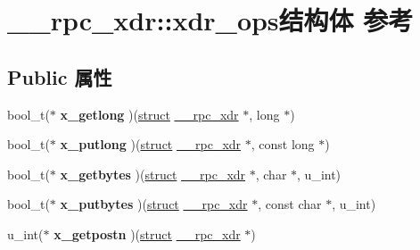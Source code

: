 \hypertarget{struct____rpc__xdr_1_1xdr__ops}{}\section{\+\_\+\+\_\+rpc\+\_\+xdr\+:\+:xdr\+\_\+ops结构体 参考}
\label{struct____rpc__xdr_1_1xdr__ops}
\subsection*{Public 属性}
\begin{DoxyCompactItemize}
\item 
\mbox{\label{struct____rpc__xdr_1_1xdr__ops_a3df5aa6cac0bef635073d771d989e66f}} 
bool\+\_\+t($\ast$ {\bfseries x\+\_\+getlong} )(\hyperlink{interfacestruct}{struct} \hyperlink{struct____rpc__xdr}{\+\_\+\+\_\+rpc\+\_\+xdr} $\ast$, long $\ast$)
\item 
\mbox{\label{struct____rpc__xdr_1_1xdr__ops_a6f97ff5af75068b54d5eeb89f714be36}} 
bool\+\_\+t($\ast$ {\bfseries x\+\_\+putlong} )(\hyperlink{interfacestruct}{struct} \hyperlink{struct____rpc__xdr}{\+\_\+\+\_\+rpc\+\_\+xdr} $\ast$, const long $\ast$)
\item 
\mbox{\label{struct____rpc__xdr_1_1xdr__ops_ad652c0de62c38edce1d61baa4b67b617}} 
bool\+\_\+t($\ast$ {\bfseries x\+\_\+getbytes} )(\hyperlink{interfacestruct}{struct} \hyperlink{struct____rpc__xdr}{\+\_\+\+\_\+rpc\+\_\+xdr} $\ast$, char $\ast$, u\+\_\+int)
\item 
\mbox{\label{struct____rpc__xdr_1_1xdr__ops_a7a1a5ac7a82942203215f656d15b313b}} 
bool\+\_\+t($\ast$ {\bfseries x\+\_\+putbytes} )(\hyperlink{interfacestruct}{struct} \hyperlink{struct____rpc__xdr}{\+\_\+\+\_\+rpc\+\_\+xdr} $\ast$, const char $\ast$, u\+\_\+int)
\item 
\mbox{\label{struct____rpc__xdr_1_1xdr__ops_aaebd30d1056e3e061d2019aa2cda4a5a}} 
u\+\_\+int($\ast$ {\bfseries x\+\_\+getpostn} )(\hyperlink{interfacestruct}{struct} \hyperlink{struct____rpc__xdr}{\+\_\+\+\_\+rpc\+\_\+xdr} $\ast$)
\item 
\mbox{\label{struct____rpc__xdr_1_1xdr__ops_a8eed1e7eabc3faf8b6a56b7a60a5254e}} 

\end{DoxyCompactItemize}
